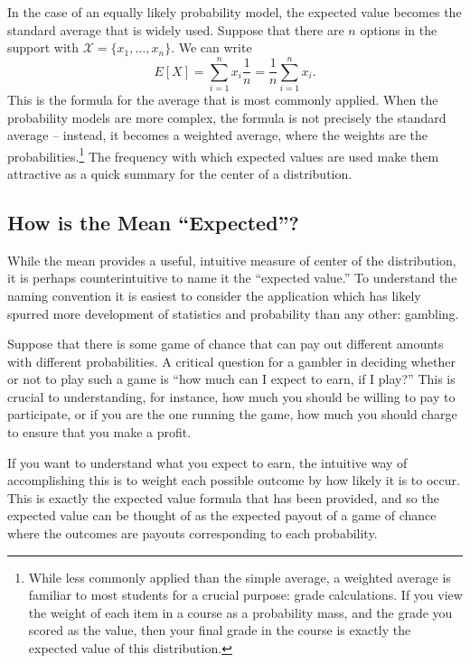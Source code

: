 \documentclass[
  letterpaper,
  DIV=11,
  numbers=noendperiod]{scrreprt}
\theoremstyle{definition}
\theoremstyle{definition}
\theoremstyle{definition}
\theoremstyle{remark}
\begin{document}
In the case of an equally likely probability model, the expected value
becomes the standard average that is widely used. Suppose that there are
\(n\) options in the support with \(\mathcal{X} = \{x_1,\dots,x_n\}\).
We can write
\[E[X] = \sum_{i=1}^n x_i\frac{1}{n} = \frac{1}{n}\sum_{i=1}^nx_i.\]
This is the formula for the average that is most commonly applied. When
the probability models are more complex, the formula is not precisely
the standard average -- instead, it becomes a weighted average, where
the weights are the probabilities.\footnote{While less commonly applied
  than the simple average, a weighted average is familiar to most
  students for a crucial purpose: grade calculations. If you view the
  weight of each item in a course as a probability mass, and the grade
  you scored as the value, then your final grade in the course is
  exactly the expected value of this distribution.} The frequency with
which expected values are used make them attractive as a quick summary
for the center of a distribution.

\subsection{How is the Mean
``Expected''?}\label{how-is-the-mean-expected}

While the mean provides a useful, intuitive measure of center of the
distribution, it is perhaps counterintuitive to name it the ``expected
value.'' To understand the naming convention it is easiest to consider
the application which has likely spurred more development of statistics
and probability than any other: gambling.

Suppose that there is some game of chance that can pay out different
amounts with different probabilities. A critical question for a gambler
in deciding whether or not to play such a game is ``how much can I
expect to earn, if I play?'' This is crucial to understanding, for
instance, how much you should be willing to pay to participate, or if
you are the one running the game, how much you should charge to ensure
that you make a profit.

If you want to understand what you expect to earn, the intuitive way of
accomplishing this is to weight each possible outcome by how likely it
is to occur. This is exactly the expected value formula that has been
provided, and so the expected value can be thought of as the expected
payout of a game of chance where the outcomes are payouts corresponding
to each probability.
\end{document}
